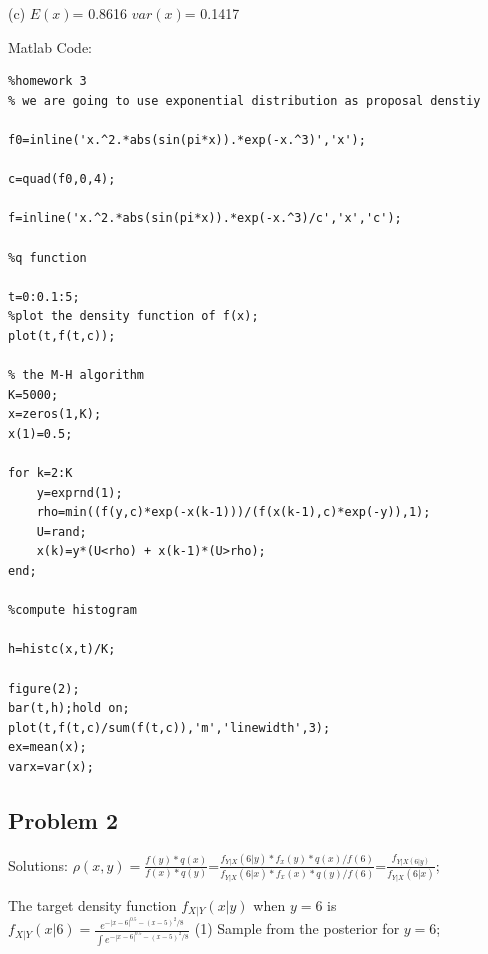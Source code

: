 \documentclass[12pt] {article}
\begin{document}
(c) $E(x)$= 0.8616 $var(x)$=  0.1417

Matlab Code:
\begin{lstlisting}
%homework 3
% we are going to use exponential distribution as proposal denstiy

f0=inline('x.^2.*abs(sin(pi*x)).*exp(-x.^3)','x');

c=quad(f0,0,4); 

f=inline('x.^2.*abs(sin(pi*x)).*exp(-x.^3)/c','x','c');

%q function

t=0:0.1:5;
%plot the density function of f(x);
plot(t,f(t,c));

% the M-H algorithm
K=5000;
x=zeros(1,K);
x(1)=0.5;

for k=2:K
    y=exprnd(1);
    rho=min((f(y,c)*exp(-x(k-1)))/(f(x(k-1),c)*exp(-y)),1);
    U=rand;
    x(k)=y*(U<rho) + x(k-1)*(U>rho);
end;

%compute histogram

h=histc(x,t)/K;

figure(2);
bar(t,h);hold on;
plot(t,f(t,c)/sum(f(t,c)),'m','linewidth',3);
ex=mean(x);
varx=var(x);
\end{lstlisting}

\subsection{Problem 2}
Solutions:
$\rho(x,y)=\frac{f(y)*q(x)}{f(x)*q(y)}$=$\frac{f_{Y|X}(6|y)*f_x(y)*q(x)/f(6)}{f_{Y|X}(6|x)*f_x(x)*q(y)/f(6)}$=$\frac{f_{Y|X(6|y)}}{f_{Y|X}(6|x)}$;

The target density function $f_{X|Y}(x|y)$ when $y=6$ is $f_{X|Y}(x|6)=\frac{e^{-|x-6|^{0.5}-(x-5)^2/8}}{\int{e^{-|x-6|^{0.5}-(x-5)^2/8}}}$
(1) Sample from the posterior for $y=6$;
\end{document}
